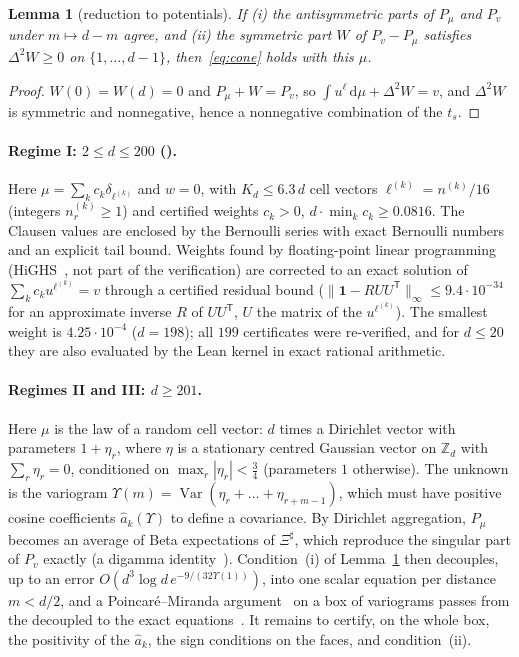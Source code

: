 \documentclass[11pt]{article}
\newtheorem{lemma}{Lemma}[section]
\theoremstyle{remark}
\numberwithin{equation}{section}
\newcommand{\Z}{\mathbb{Z}}
\newcommand{\one}{\mathbf{1}}
\newcommand{\Sh}{\Xi^{\sharp}}
\newcommand{\dd}{\,\mathrm{d}}
\begin{document}
\begin{lemma}[reduction to potentials]\label{lem:potentials}
If \textup{(i)} the antisymmetric parts of $P_\mu$ and $P_v$ under $m\mapsto d-m$ agree, and \textup{(ii)} the symmetric
part $W$ of $P_v-P_\mu$ satisfies $\Delta^2W\ge0$ on $\{1,\dots,d-1\}$, then~\eqref{eq:cone} holds with this $\mu$.
\end{lemma}

\begin{proof}
$W(0)=W(d)=0$ and $P_\mu+W=P_v$, so $\int u^\ell\dd\mu+\Delta^2W=v$, and $\Delta^2W$ is symmetric and nonnegative,
hence a nonnegative combination of the $t_s$.
\end{proof}

\paragraph{Regime I: $2\le d\le200$ \textup{(\cite[Proposition~6.2]{MSmath})}.}
Here $\mu=\sum_kc_k\delta_{\ell^{(k)}}$ and $w=0$, with $K_d\le6.3\,d$ cell vectors $\ell^{(k)}=n^{(k)}/16$ (integers
$n^{(k)}_r\ge1$) and certified weights $c_k>0$, $d\cdot\min_kc_k\ge0.0816$. The Clausen values are enclosed by the
Bernoulli series with exact Bernoulli numbers and an explicit tail bound. Weights found by floating-point linear
programming (HiGHS~\cite{HiGHS}, not part of the verification) are corrected to an exact solution of
$\sum_kc_ku^{\ell^{(k)}}=v$ through a certified residual bound ($\|\one-RUU^{\mathsf T}\|_\infty\le9.4\cdot10^{-34}$
for an approximate inverse $R$ of $UU^{\mathsf T}$, $U$ the matrix of the $u^{\ell^{(k)}}$). The smallest weight is
$4.25\cdot10^{-4}$ ($d=198$); all $199$ certificates were re-verified, and for $d\le20$ they are also evaluated by the
Lean kernel in exact rational arithmetic.

\paragraph{Regimes II and III: $d\ge201$.}
Here $\mu$ is the law of a random cell vector: $d$ times a Dirichlet vector with parameters $1+\eta_r$, where
$\eta$ is a stationary centred Gaussian vector on $\Z_d$ with $\sum_r\eta_r=0$, conditioned on $\max_r|\eta_r|<\frac34$
(parameters $1$ otherwise). The unknown is the variogram $\Upsilon(m)=\operatorname{Var}(\eta_r+\dots+\eta_{r+m-1})$,
which must have positive cosine coefficients $\hat a_k(\Upsilon)$ to define a covariance. By Dirichlet aggregation,
$P_\mu$ becomes an average of Beta expectations of $\Sh$, which reproduce the singular part of $P_v$ exactly (a digamma
identity~\cite[Lemma~6.3]{MSmath}). Condition~(i) of Lemma~\ref{lem:potentials} then decouples, up to an error
$O(d^3\log d\,e^{-9/(32\Upsilon(1))})$, into one scalar equation per distance $m<d/2$, and a Poincar\'e--Miranda
argument~\cite{Kulpa} on a box of variograms passes from the decoupled to the exact equations~\cite[Lemmas~6.4,
6.5]{MSmath}. It remains to certify, on the whole box, the positivity of the $\hat a_k$, the sign conditions on the
faces, and condition~(ii).
\end{document}
